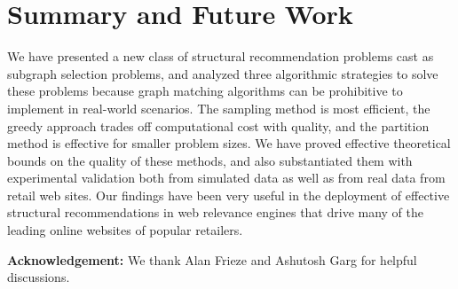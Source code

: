 \section{Summary and Future Work}
We have presented a new class of structural recommendation problems
cast as subgraph selection problems, and analyzed three algorithmic
strategies to solve these problems because graph matching algorithms can be
prohibitive to implement in real-world scenarios. The sampling method is most
efficient, the greedy approach trades off computational cost with
quality, and the partition method is effective for smaller problem
sizes. We have proved effective theoretical bounds on the quality
of these methods, and also substantiated them with experimental
validation both from simulated data as well as from real data from
retail web sites. Our findings have been very useful in the
deployment of effective structural recommendations in web relevance
engines that drive many of the leading online websites of popular
retailers. \vs


{\bf Acknowledgement:} We thank Alan Frieze and Ashutosh Garg for helpful
discussions.
